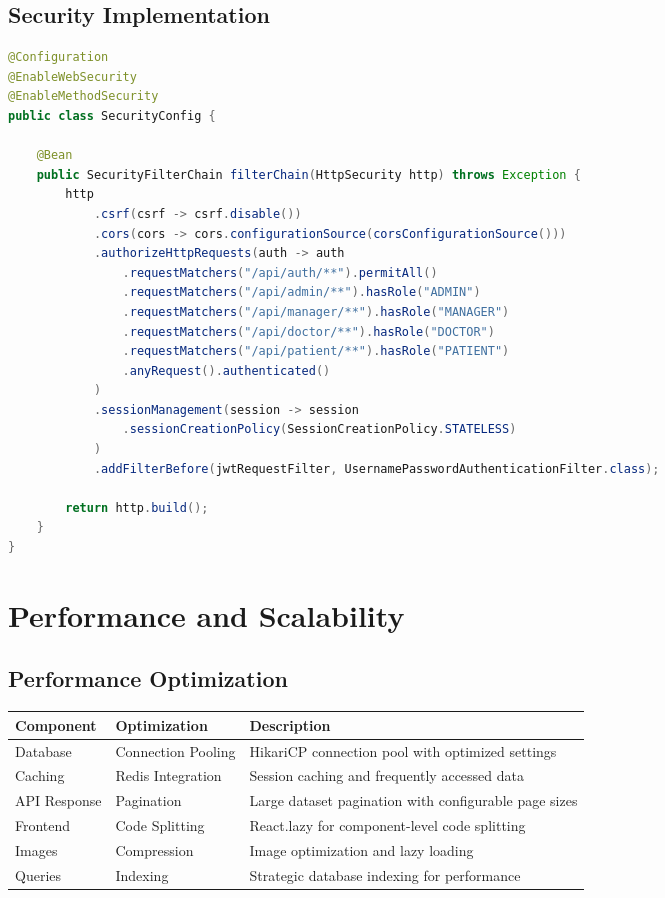 \documentclass[12pt,a4paper]{article}
\begin{document}
\subsection{Security Implementation}

\begin{lstlisting}[language=Java, caption=Security Configuration]
@Configuration
@EnableWebSecurity
@EnableMethodSecurity
public class SecurityConfig {
    
    @Bean
    public SecurityFilterChain filterChain(HttpSecurity http) throws Exception {
        http
            .csrf(csrf -> csrf.disable())
            .cors(cors -> cors.configurationSource(corsConfigurationSource()))
            .authorizeHttpRequests(auth -> auth
                .requestMatchers("/api/auth/**").permitAll()
                .requestMatchers("/api/admin/**").hasRole("ADMIN")
                .requestMatchers("/api/manager/**").hasRole("MANAGER")
                .requestMatchers("/api/doctor/**").hasRole("DOCTOR")
                .requestMatchers("/api/patient/**").hasRole("PATIENT")
                .anyRequest().authenticated()
            )
            .sessionManagement(session -> session
                .sessionCreationPolicy(SessionCreationPolicy.STATELESS)
            )
            .addFilterBefore(jwtRequestFilter, UsernamePasswordAuthenticationFilter.class);
        
        return http.build();
    }
}
\end{lstlisting}

\section{Performance and Scalability}

\subsection{Performance Optimization}

\begin{longtable}{|p{3cm}|p{3cm}|p{8cm}|}
\hline
\textbf{Component} & \textbf{Optimization} & \textbf{Description} \\
\hline
Database & Connection Pooling & HikariCP connection pool with optimized settings \\
\hline
Caching & Redis Integration & Session caching and frequently accessed data \\
\hline
API Response & Pagination & Large dataset pagination with configurable page sizes \\
\hline
Frontend & Code Splitting & React.lazy for component-level code splitting \\
\hline
Images & Compression & Image optimization and lazy loading \\
\hline
Queries & Indexing & Strategic database indexing for performance \\
\hline
\end{longtable}
\end{document}
